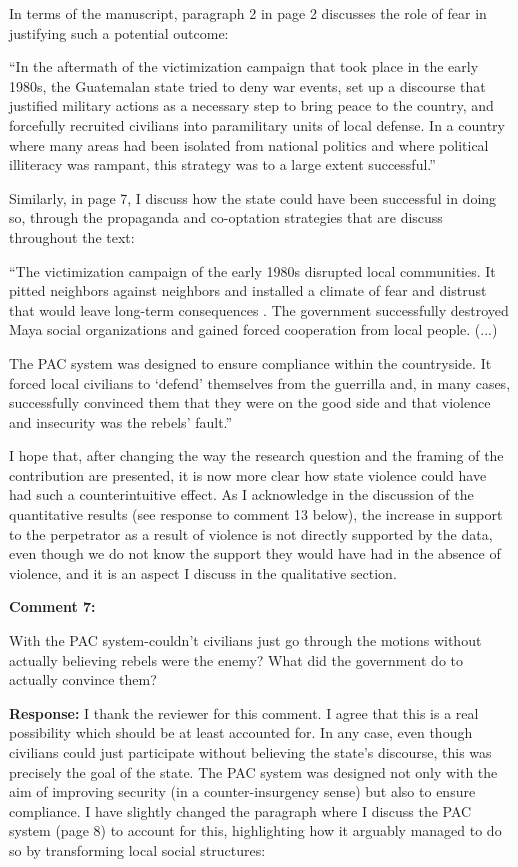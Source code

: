 \documentclass[12pt, a4paper, notitlepage]{article}
\begin{document}
In terms of the manuscript, paragraph 2 in page 2 discusses the role of fear in justifying such a potential outcome:

``In the aftermath of the victimization campaign that took place in the early 1980s, the Guatemalan state tried to deny war events, set up a discourse that justified military actions as a necessary step to bring peace to the country, and forcefully recruited civilians into paramilitary units of local defense.
In a country where many areas had been isolated from national politics and where political illiteracy was rampant, this strategy was to a large extent successful.''

Similarly, in page 7, I discuss how the state could have been successful in doing so, through the propaganda and co-optation strategies that are discuss throughout the text:

``The victimization campaign of the early 1980s disrupted local communities. It pitted neighbors against neighbors and installed a climate of fear and distrust that would leave long-term consequences \citep{Burrell:2013aa}.
The government successfully destroyed Maya social organizations and gained forced cooperation from local people. (...)

The PAC system was designed to ensure compliance within the countryside.
It forced local civilians to `defend' themselves from the guerrilla and, in many cases, successfully convinced them that they were on the good side and that violence and insecurity was the rebels' fault.''

I hope that, after changing the way the research question and the framing of the contribution are presented, it is now more clear how state violence could have had such a counterintuitive effect. As I acknowledge in the discussion of the quantitative results (see response to comment 13 below), the increase in support to the perpetrator as a result of violence is not directly supported by the data, even though we do not know the support they would have had in the absence of violence, and it is an aspect I discuss in the qualitative section.

\vspace{15pt}
\noindent\textbf{Comment 7:}
\begin{displayquote}
With the PAC system-couldn't civilians just go through the motions without actually believing rebels were the enemy? What did the government do to actually convince them?
\end{displayquote}

\noindent\textbf{Response:} I thank the reviewer for this comment. I agree that this is a real possibility which should be at least accounted for. In any case, even though civilians could just participate without believing the state's discourse, this was precisely the goal of the state. The PAC system was designed not only with the aim of improving security (in a counter-insurgency sense) but also to ensure compliance. I have slightly changed the paragraph where I discuss the PAC system (page 8) to account for this, highlighting how it arguably managed to do so by transforming local social structures:
\end{document}
